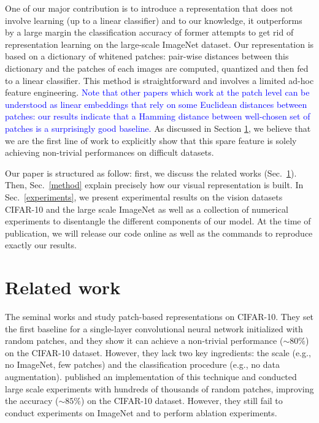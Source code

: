 \documentclass{article}
\newcommand{\Edouard}[1]{\textcolor{blue}{#1}}
\begin{document}
One of our major contribution is to introduce a representation that does not involve learning (up to a linear classifier) and to our knowledge, it outperforms by a large margin the classification accuracy of former attempts to get rid of representation learning on the large-scale ImageNet dataset. Our representation is based on a dictionary of whitened patches: pair-wise distances between this dictionary and the patches of each images are computed, quantized and then fed to a linear classifier. This method is  straightforward and involves a limited ad-hoc feature engineering. \Edouard{Note that other papers which work at the patch level can be understood as linear embeddings that rely on some Euclidean distances between patches: our results indicate that a Hamming distance between well-chosen set of patches is a surprisingly good baseline.} As discussed in Section \ref{related_work}, we believe that we are the first line of work to explicitly show that this  spare feature is solely achieving non-trivial performances on difficult datasets.

Our paper is structured as follow: first, we discuss the related works (Sec.~\ref{related_work}). Then, Sec.~\ref{method} explain precisely how our visual representation is built. In Sec.~\ref{experiments}, we present experimental results on the vision datasets CIFAR-10 and the large scale  ImageNet as well as a collection of numerical experiments to disentangle the different components of our model. At the time of publication, we will release our code online as well as the commands to reproduce exactly our results.


\section{Related work}
\label{related_work}

The seminal works \cite{coates2011analysis} and \cite{coates2011importance}  study patch-based representations on CIFAR-10.
They set the first baseline for a single-layer convolutional neural network initialized with random patches, and they show it  can achieve a non-trivial performance ($\sim 80 \%$) on the CIFAR-10 dataset. However, they lack two key ingredients: the scale (e.g., no ImageNet, few patches) and the classification procedure (e.g., no data augmentation).
 \cite{recht2019imagenet} published an implementation of this technique and conducted large scale experiments with hundreds of thousands of random patches, improving the accuracy ($\sim 85 \%$) on the CIFAR-10 dataset.
However, they still fail to conduct experiments on ImageNet and to perform  ablation experiments.
\end{document}
